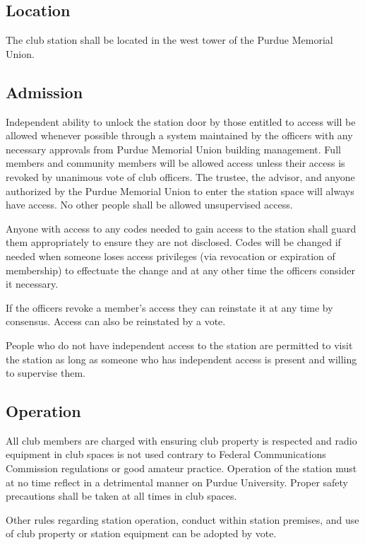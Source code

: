 \documentclass{article}
\begin{document}
\subsection{Location}

The club station shall be located in the west tower of the Purdue Memorial
Union.

\subsection{Admission}

Independent ability to unlock the station door by those entitled to access will
be allowed whenever possible through a system maintained by the officers with
any necessary approvals from Purdue Memorial Union building management. Full
members and community members will be allowed access unless their access is
revoked by unanimous vote of club officers. The trustee, the advisor, and anyone
authorized by the Purdue Memorial Union to enter the station space will always
have access. No other people shall be allowed unsupervised access.

Anyone with access to any codes needed to gain access to the station shall guard
them appropriately to ensure they are not disclosed. Codes will be changed if
needed when someone loses access privileges (via revocation or expiration of
membership) to effectuate the change and at any other time the officers consider
it necessary.

If the officers revoke a member's access they can reinstate it at any time by
consensus. Access can also be reinstated by a vote.

People who do not have independent access to the station are permitted to visit
the station as long as someone who has independent access is present and willing
to supervise them.

\subsection{Operation}

All club members are charged with ensuring club property is respected and radio
equipment in club spaces is not used contrary to Federal Communications
Commission regulations or good amateur practice. Operation of the station must
at no time reflect in a detrimental manner on Purdue University. Proper safety
precautions shall be taken at all times in club spaces.

Other rules regarding station operation, conduct within station premises, and
use of club property or station equipment can be adopted by vote.
\end{document}
